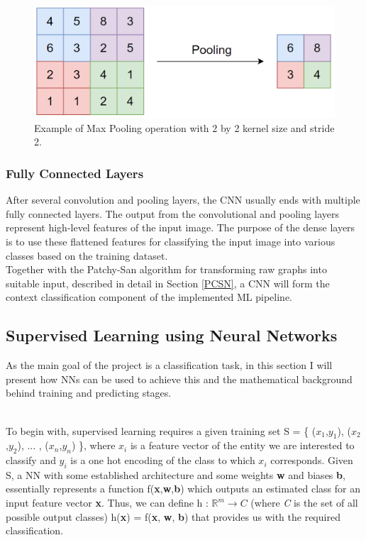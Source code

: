 \begin{figure}[H]
  \centering
  \includegraphics[scale=0.25]{Images/pooling.png}
  \caption{Example of Max Pooling operation with 2 by 2 kernel size and stride 2.}
  \label{Pooling}
\end{figure}

\subsubsection*{Fully Connected Layers}

After several convolution and pooling layers, the CNN usually ends with multiple fully connected layers. The output from the convolutional and pooling layers represent high-level features of the input image. The purpose of the dense layers is to use these flattened features for classifying the input image into various classes based on the training dataset. \\

Together with the Patchy-San algorithm for transforming raw graphs into suitable input, described in detail in Section \ref{PCSN}, a CNN will form the context classification component of the implemented ML pipeline. \\

\subsection{Supervised Learning using Neural Networks}

As the main goal of the project is a classification task, in this section I will present how NNs can be used to achieve this and the mathematical background behind training and predicting stages. \\\

To begin with, supervised learning requires a given training set S = \{ ($x_1$,$y_1$), ($x_2$,$y_2$), ... , ($x_n$,$y_n$) \}, where \textbf{$x_i$} is a feature vector of the entity we are interested to classify and \textbf{$y_i$} is a one hot encoding of the class to which \textbf{$x_i$} corresponds. Given S, a NN with some established architecture and some weights \textbf{w} and biases \textbf{b}, essentially represents a function f(\textbf{x},\textbf{w},\textbf{b}) which outputs an estimated class for an input feature vector \textbf{x}. Thus, we can define h : $\mathbb{R}^m \rightarrow \textit{C}$ (where \textit{C} is the set of all possible output classes) h(\textbf{x}) = f(\textbf{x}, \textbf{w}, \textbf{b}) that provides us with the required classification.

